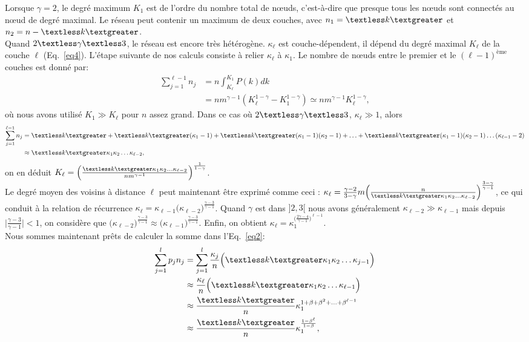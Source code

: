Lorsque $\gamma=2$, le degré maximum $K_1$ est de l'ordre du nombre total de nœuds, c'est-à-dire que presque tous les nœuds sont connectés au nœud de degré maximal. Le réseau peut contenir un maximum de deux couches, avec $n_1=\km$ et $n_2=n-\km $. \\
Quand $2\textless \gamma \textless 3$, le réseau est encore très hétérogène. $\kappa_{\ell} $ est couche-dépendent, il dépend du degré maximal $K_{\ell} $ de la couche $\ell$ (Eq.~\eqref{eq4}). L'étape suivante de nos calculs consiste à relier $\kappa_{\ell}$ à $\kappa_1$. Le nombre de nœuds entre le premier et le $(\ell-1)^{\text{ème}}$ couches est donné par:
\begin{align}
\sum_{j=1}^{\ell-1}n_j&=n\int_{K_{\ell}}^{K_1} P(k)dk \nonumber \\
&=nm^{\gamma-1}(K_{\ell}^{1-\gamma}-K_1^{1-\gamma})\simeq nm^{\gamma-1} K_{\ell}^{1-\gamma},
\label{eq5}
\end{align}
où nous avons utilisé $K_1\gg K_{\ell}$ pour $n$ assez grand. Dans ce cas où $2\textless \gamma \textless 3$, $\kappa_{\ell}\gg 1$, alors
\begin{align}
\sum_{j=1}^{\ell-1}n_j&=\km+\km(\kappa_1-1)+\km(\kappa_1-1)(\kappa_2-1)+\ldots+\km(\kappa_1-1)(\kappa_2-1)\ldots(\kappa_{\ell-1}-2)\nonumber \\
&\approx\km\kappa_1\kappa_2\ldots\kappa_{\ell-2},
\label{eq6}
\end{align}
on en déduit
$K_{\ell}=\Big(\frac{\km\kappa_1\kappa_2\ldots\kappa_{\ell-2}}{nm^{\gamma-1}}\Big)^{\frac{1}{1-\gamma}}$.\\
Le degré moyen des voisins à distance $\ell $ peut maintenant être exprimé comme ceci :
$\kappa_{\ell}=\frac{\gamma-2}{3-\gamma}m\Big(\frac{n}{\km\kappa_1\kappa_2\ldots\kappa_{\ell-2}}\Big)^{\frac{3-\gamma}{\gamma-1}}$, ce qui conduit à la relation de récurrence $\kappa_{\ell}=\kappa_{\ell-1}
\Big(\kappa_{\ell-2}\Big)^{\frac{\gamma-3}{\gamma-1}}$.  Quand $\gamma$ est dans $]2,3[$ nous avons généralement
$\kappa_{\ell-2} \gg \kappa_{\ell-1}$  mais depuis $\mid\frac{\gamma-3}{\gamma-1}\mid<1$, on considère que $\Big(\kappa_{\ell-2}\Big)^{\frac{\gamma-3}{\gamma-1}}\approx
\Big(\kappa_{\ell-1}\Big)^{\frac{\gamma-3}{\gamma-1}}$. Enfin, on obtient $\kappa_{\ell}=\kappa_1^{\Big(\frac{2\gamma-4}{\gamma-1}\Big)^{\ell-1}}$.\\
Nous sommes maintenant prêts de calculer la somme dans l'Eq.~\eqref{eq2}:
\begin{align}
\sum_{j=1}^{l} p_jn_j&=\sum_{j=1}^{l}\frac{\kappa_j}{n}\Big(\km\kappa_1\kappa_2\ldots\kappa_{j-1}\Big) \nonumber\\ 
&\approx \frac{\kappa_{\ell}}{n}\Big(\km\kappa_1\kappa_2\ldots\kappa_{\ell-1}\Big) \nonumber \\
&\approx \frac{\km}{n}\kappa_1^{1+\beta+\beta^2+\ldots+\beta^{\ell-1}} \nonumber \\
&\approx \frac{\km}{n}\kappa_1^{\frac{1-\beta^{\ell}}{1-\beta}},
\label{eq7}
\end{align}
